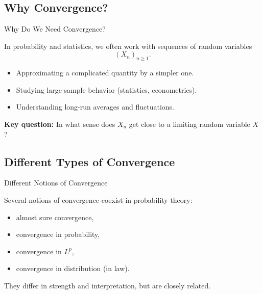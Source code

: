 \documentclass[aspectratio=169]{beamer}
\begin{document}
\subsection{Why Convergence?}

\begin{frame}{Why Do We Need Convergence?}

In probability and statistics, we often work with sequences of random variables
\[
(X_n)_{n\ge1}.
\]
\pause
\medskip

\begin{itemize}
  \item Approximating a complicated quantity by a simpler one.\pause
  \item Studying large-sample behavior (statistics, econometrics).\pause
  \item Understanding long-run averages and fluctuations.\pause
\end{itemize}

\medskip

\textbf{Key question:}
In what sense does \(X_n\) get close to a limiting random variable \(X\)?
\pause
\end{frame}

\subsection{Different Types of Convergence}

\begin{frame}{Different Notions of Convergence}

Several notions of convergence coexist in probability theory:
\pause
\begin{itemize}
  \item almost sure convergence,\pause
  \item convergence in probability,\pause
  \item convergence in \(L^p\),\pause
  \item convergence in distribution (in law).\pause
\end{itemize}

\medskip

They differ in strength and interpretation, but are closely related.

\end{frame}
\end{document}
